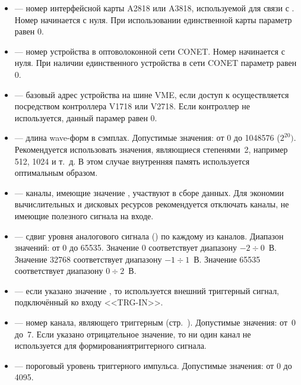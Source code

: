 \begin{itemize}

\item {} --- номер интерфейсной карты A2818 или A3818, используемой для связи с \DEVICE{}. Номер начинается с нуля. При использовании единственной карты параметр равен 0.

\item {} --- номер устройства в оптоволоконной сети CONET. Номер начинается с нуля. При наличии единственного устройства в сети CONET параметр равен 0.

\item {} --- базовый адрес устройства на шине VME, если доступ к \DEVICE{} осуществляется посредством контроллера V1718 или V2718. Если контроллер не используется, данный парамер равен 0.

\item {} --- длина wave-форм в сэмплах. Допустимые значения: от 0 до 1048576 ($2^{20})$. Рекомендуется использовать значения, являющиеся степенями~2, например 512, 1024 и т.~д. В этом случае внутренняя память \DEVICE{} используется оптимальным образом.

\item {} --- каналы, имеющие значение , участвуют в сборе данных. Для экономии вычислительных и дисковых ресурсов рекомендуется отключать каналы, не имеющие полезного сигнала на входе.

\item {} --- сдвиг уровня аналогового сигнала () \cite{CaenUM3051AIS} по каждому из каналов. Диапазон значений: от 0 до 65535. Значение 0 соответствует диапазону $-2 \div 0$~В. Значение 32768 соответствует диапазону $-1 \div 1$~В. Значение 65535 соответствует диапазону $0 \div 2$~В. 

\item {} --- если указано значение , то используется внешний триггерный сигнал, подключённый ко входу <<TRG-IN>>.

\item {} --- номер канала, являющего триггерным (стр.~\pageref{sec_basic}). Допустимые значения: от~0 до~7. Если указано отрицательное значение, то ни один канал не используется для формированиятриггерного сигнала.

\item {} --- пороговый уровень триггерного импульса. Допустимые значения: от 0 до 4095.


\end{itemize}
